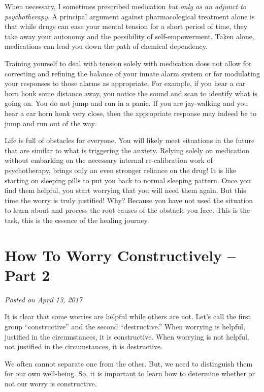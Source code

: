\documentclass[]{book}
\begin{document}
When necessary, I sometimes prescribed medication \emph{but only as an adjunct to psychotherapy}. A principal argument against pharmacological treatment alone is that while drugs can ease your mental tension for a short period of time, they take away your autonomy and the possibility of self-empowerment. Taken alone, medications can lead you down the path of chemical dependency.

Training yourself to deal with tension solely with medication does not allow for correcting and refining the balance of your innate alarm system or for modulating your responses to those alarms as appropriate. For example, if you hear a car horn honk some distance away, you notice the sound and scan to identify what is going on. You do not jump and run in a panic. If you are jay-walking and you hear a car horn honk very close, then the appropriate response may indeed be to jump and run out of the way.

Life is full of obstacles for everyone. You will likely meet situations in the future that are similar to what is triggering the anxiety. Relying solely on medication without embarking on the necessary internal re-calibration work of psychotherapy, brings only an even stronger reliance on the drug! It is like starting on sleeping pills to put you back to normal sleeping pattern. Once you find them helpful, you start worrying that you will need them again. But this time the worry is truly justified! Why? Because you have not used the situation to learn about and process the root causes of the obstacle you face. This is the task, this is the essence of the healing journey.

\hypertarget{how-to-worry-constructively-part-2}{%
\section{How To Worry Constructively -- Part 2}\label{how-to-worry-constructively-part-2}}

\emph{Posted on April 13, 2017}

It is clear that some worries are helpful while others are not. Let's call the first group ``constructive'' and the second ``destructive.'' When worrying is helpful, justified in the circumstances, it is constructive. When worrying is not helpful, not justified in the circumstances, it is destructive.

We often cannot separate one from the other. But, we need to distinguish them for our own well-being. So, it is important to learn how to determine whether or not our worry is constructive.
\end{document}
